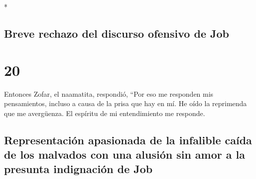 \begin{paracol}{2}
\begin{otherlanguage}{english}
\end{otherlanguage}

\switchcolumn[0]*

\hypertarget{breve-rechazo-del-discurso-ofensivo-de-job}{%
\subsection{Breve rechazo del discurso ofensivo de
Job}\label{breve-rechazo-del-discurso-ofensivo-de-job}}

\hypertarget{section-38}{%
\section{20}\label{section-38}}

 Entonces Zofar, el naamatita, respondió, 
``Por eso me responden mis pensamientos, incluso a causa de la prisa que
hay en mí.  He oído la reprimenda que me avergüenza. El
espíritu de mi entendimiento me responde.

\hypertarget{representaciuxf3n-apasionada-de-la-infalible-cauxedda-de-los-malvados-con-una-alusiuxf3n-sin-amor-a-la-presunta-indignaciuxf3n-de-job}{%
\subsection{Representación apasionada de la infalible caída de los
malvados con una alusión sin amor a la presunta indignación de
Job}\label{representaciuxf3n-apasionada-de-la-infalible-cauxedda-de-los-malvados-con-una-alusiuxf3n-sin-amor-a-la-presunta-indignaciuxf3n-de-job}}


\end{paracol}
